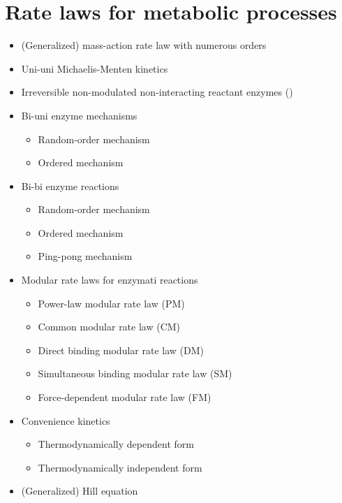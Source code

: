\section{Rate laws for metabolic processes}
\begin{itemize}
  \item (Generalized) mass-action rate law with numerous orders \citep[p.~16]{Guldberg1879, Heinrich1996}
  \item Uni-uni Michaelis-Menten kinetics \citep{Michaelis1913}
  \item Irreversible non-modulated non-interacting reactant enzymes (\SBO)
  \item Bi-uni enzyme mechanisms \citep{Segel1993, Bisswanger2000, Cornish-Bowden2004}
  \begin{itemize}
    \item Random-order mechanism
    \item Ordered mechanism
  \end{itemize}
  \item Bi-bi enzyme reactions \citep{Segel1993, Bisswanger2000, Cornish-Bowden2004}
  \begin{itemize}
    \item Random-order mechanism \citep[p.~169]{Cornish-Bowden2004}
    \item Ordered mechanism
    \item Ping-pong mechanism
  \end{itemize}
  \item Modular rate laws for enzymati reactions \citep{Liebermeister2010}
  \begin{itemize}
    \item Power-law modular rate law (PM)
    \item Common modular rate law (CM)
    \item Direct binding modular rate law (DM)
    \item Simultaneous binding modular rate law (SM)
    \item Force-dependent modular rate law (FM)
  \end{itemize}
  \item Convenience kinetics \citep{Liebermeister2006}
  \begin{itemize}
    \item Thermodynamically dependent form
    \item Thermodynamically independent form
  \end{itemize}
  \item (Generalized) Hill equation \citep[p.~314]{Hill1910, Cornish-Bowden2004}
\end{itemize}

